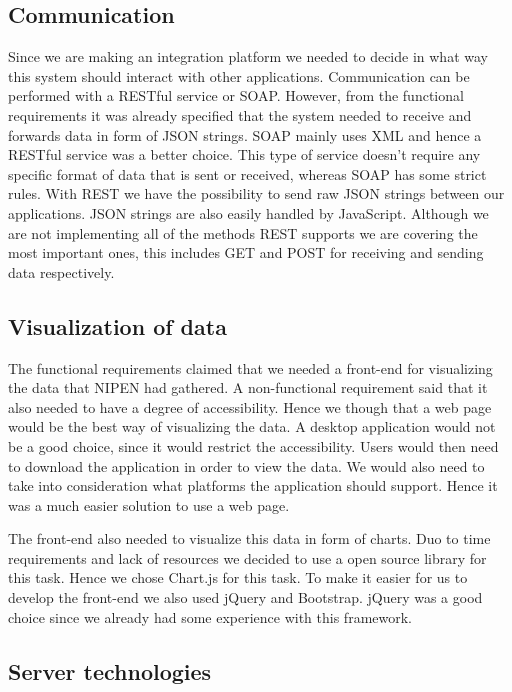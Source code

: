 \subsection{Communication}

Since we are making an integration platform we needed to decide in what way this system should interact with other applications.
Communication can be performed with a RESTful service or SOAP.
However, from the functional requirements it was already specified that the system needed to receive and forwards data in form of JSON strings.
SOAP mainly uses XML and hence a RESTful service was a better choice.
This type of service doesn't require any specific format of data that is sent or received, whereas SOAP has some strict rules.
With REST we have the possibility to send raw JSON strings between our applications.
JSON strings are also easily handled by JavaScript.
Although we are not implementing all of the methods REST supports we are covering the most important ones, this includes GET and POST for receiving and sending data respectively.

\subsection{Visualization of data}

The functional requirements claimed that we needed a front-end for visualizing the data that NIPEN had gathered.
A non-functional requirement said that it also needed to have a degree of accessibility.
Hence we though that a web page would be the best way of visualizing the data.
A desktop application would not be a good choice, since it would restrict the accessibility.
Users would then need to download the application in order to view the data.
We would also need to take into consideration what platforms the application should support.
Hence it was a much easier solution to use a web page.

The front-end also needed to visualize this data in form of charts.
Duo to time requirements and lack of resources we decided to use a open source library for this task.
Hence we chose Chart.js for this task.
To make it easier for us to develop the front-end we also used jQuery and Bootstrap.
jQuery was a good choice since we already had some experience with this framework.

\subsection{Server technologies}

